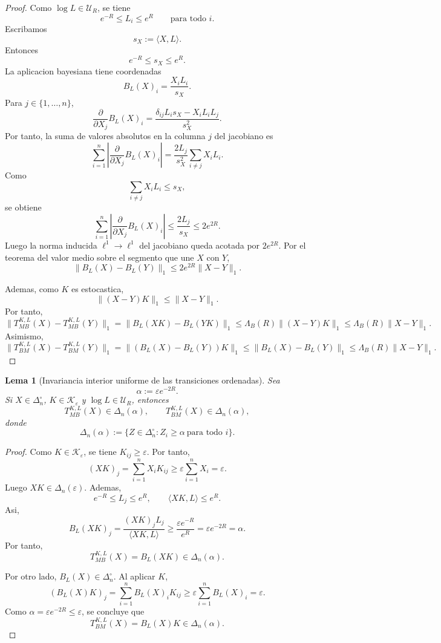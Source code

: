 \documentclass[12pt]{article}
\newtheorem{lema}{Lema}[section]
\begin{document}
\begin{proof}
Como \(\log L\in\mathcal U_R\), se tiene
\[
e^{-R}\le L_i\le e^R
\qquad
\text{para todo }i.
\]
Escribamos
\[
s_X:=\langle X,L\rangle.
\]
Entonces
\[
e^{-R}\le s_X\le e^R.
\]
La aplicacion bayesiana tiene coordenadas
\[
B_L(X)_i=\frac{X_iL_i}{s_X}.
\]
Para \(j\in\{1,\dots,n\}\),
\[
\frac{\partial}{\partial X_j}B_L(X)_i
=
\frac{\delta_{ij}L_i s_X-X_iL_iL_j}{s_X^2}.
\]
Por tanto, la suma de valores absolutos en la columna \(j\) del jacobiano es
\[
\sum_{i=1}^n
\left|
\frac{\partial}{\partial X_j}B_L(X)_i
\right|
=
\frac{2L_j}{s_X^2}\sum_{i\neq j}X_iL_i.
\]
Como
\[
\sum_{i\neq j}X_iL_i\le s_X,
\]
se obtiene
\[
\sum_{i=1}^n
\left|
\frac{\partial}{\partial X_j}B_L(X)_i
\right|
\le
\frac{2L_j}{s_X}
\le
2e^{2R}.
\]
Luego la norma inducida \(\ell^1\to\ell^1\) del jacobiano queda acotada por \(2e^{2R}\). Por el teorema del valor medio sobre el segmento que une \(X\) con \(Y\),
\[
\|B_L(X)-B_L(Y)\|_1
\le
2e^{2R}\|X-Y\|_1.
\]

Ademas, como \(K\) es estocastica,
\[
\|(X-Y)K\|_1\le \|X-Y\|_1.
\]
Por tanto,
\[
\|T_{MB}^{K,L}(X)-T_{MB}^{K,L}(Y)\|_1
=
\|B_L(XK)-B_L(YK)\|_1
\le
\Lambda_B(R)\|(X-Y)K\|_1
\le
\Lambda_B(R)\|X-Y\|_1.
\]
Asimismo,
\[
\|T_{BM}^{K,L}(X)-T_{BM}^{K,L}(Y)\|_1
=
\|(B_L(X)-B_L(Y))K\|_1
\le
\|B_L(X)-B_L(Y)\|_1
\le
\Lambda_B(R)\|X-Y\|_1.
\]
\end{proof}

\begin{lema}[Invariancia interior uniforme de las transiciones ordenadas]\label{lem:invariancia_interior_transiciones_ordenadas}
Sea
\[
\alpha:=\varepsilon e^{-2R}.
\]
Si \(X\in\Delta_n^\circ\), \(K\in\mathcal K_\varepsilon\) y \(\log L\in\mathcal U_R\), entonces
\[
T_{MB}^{K,L}(X)\in\Delta_n(\alpha),
\qquad
T_{BM}^{K,L}(X)\in\Delta_n(\alpha),
\]
donde
\[
\Delta_n(\alpha)
:=
\{Z\in\Delta_n^\circ:Z_i\ge \alpha\ \text{para todo }i\}.
\]
\end{lema}

\begin{proof}
Como \(K\in\mathcal K_\varepsilon\), se tiene \(K_{ij}\ge\varepsilon\). Por tanto,
\[
(XK)_j
=
\sum_{i=1}^n X_iK_{ij}
\ge
\varepsilon\sum_{i=1}^nX_i
=
\varepsilon.
\]
Luego \(XK\in\Delta_n(\varepsilon)\). Ademas,
\[
e^{-R}\le L_j\le e^R,
\qquad
\langle XK,L\rangle\le e^R.
\]
Asi,
\[
B_L(XK)_j
=
\frac{(XK)_jL_j}{\langle XK,L\rangle}
\ge
\frac{\varepsilon e^{-R}}{e^R}
=
\varepsilon e^{-2R}
=
\alpha.
\]
Por tanto,
\[
T_{MB}^{K,L}(X)=B_L(XK)\in\Delta_n(\alpha).
\]

Por otro lado, \(B_L(X)\in\Delta_n^\circ\). Al aplicar \(K\),
\[
(B_L(X)K)_j
=
\sum_{i=1}^n B_L(X)_iK_{ij}
\ge
\varepsilon\sum_{i=1}^n B_L(X)_i
=
\varepsilon.
\]
Como \(\alpha=\varepsilon e^{-2R}\le\varepsilon\), se concluye que
\[
T_{BM}^{K,L}(X)=B_L(X)K\in\Delta_n(\alpha).
\]
\end{proof}
\end{document}

